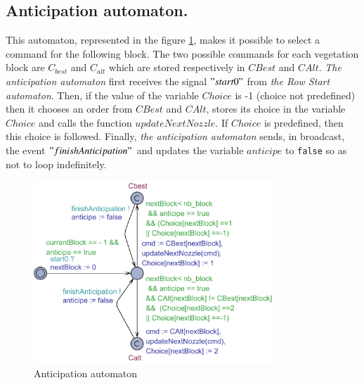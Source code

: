 \subsection{\textbf{Anticipation automaton.}} This automaton, represented in the figure \ref{fig:ant}, makes it possible to select a command for the following block. The two possible commands for each vegetation block are $ C_ {best} $ and $ C_ {alt} $ which are stored respectively in $ CBest $ and $ CAlt $. \textit{The anticipation automaton} first receives the signal $"start0"$ from \textit{the Row Start automaton}. Then, if the value of the variable $ Choice $ is -1 (choice not predefined) then it chooses an order from $ CBest $ and $ CAlt $, stores its choice in the variable $ Choice $ and calls the function $ updateNextNozzle $. If $ Choice $ is predefined, then this choice is followed. Finally, \textit{the anticipation automaton} sends, in broadcast, the event $"finishAnticipation"$ and updates the variable $anticipe$ to \texttt{false} so as not to loop indefinitely.


\begin{figure}[h!]
	\begin{center}
		\includegraphics[width=9cm]{Anticipation.pdf}
		\caption{Anticipation automaton} 
		\label{fig:ant}
	\end{center}
\end{figure}

